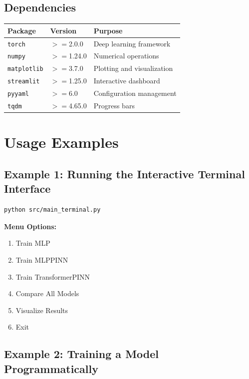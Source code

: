 \documentclass[11pt,a4paper]{article}
\begin{document}
\subsection{Dependencies}

\begin{center}
\begin{tabular}{@{}lll@{}}
\toprule
\textbf{Package} & \textbf{Version} & \textbf{Purpose} \\
\midrule
\texttt{torch} & $>=$2.0.0 & Deep learning framework \\
\texttt{numpy} & $>=$1.24.0 & Numerical operations \\
\texttt{matplotlib} & $>=$3.7.0 & Plotting and visualization \\
\texttt{streamlit} & $>=$1.25.0 & Interactive dashboard \\
\texttt{pyyaml} & $>=$6.0 & Configuration management \\
\texttt{tqdm} & $>=$4.65.0 & Progress bars \\
\bottomrule
\end{tabular}
\end{center}

\section{Usage Examples}

\subsection{Example 1: Running the Interactive Terminal Interface}

\begin{lstlisting}
python src/main_terminal.py
\end{lstlisting}

\textbf{Menu Options:}
\begin{enumerate}
    \item Train MLP
    \item Train MLPPINN
    \item Train TransformerPINN
    \item Compare All Models
    \item Visualize Results
    \item Exit
\end{enumerate}

\subsection{Example 2: Training a Model Programmatically}
\end{document}
